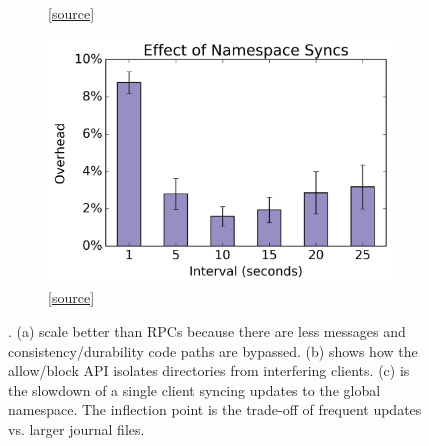 \begin{figure}[tb]
\begin{subfigure}[b]{.3\linewidth}
      \caption{
      [\href{https://github.com/michaelsevilla/cudele-popper/blob/revision/experiments/cudele-blockapi/visualize/viz.ipynb}{source}]
      }\label{fig:block-allow}
  \end{subfigure}
  \begin{subfigure}[b]{.3\linewidth}
      \centering
      \includegraphics[width=1.0\linewidth]{graphs/slowdown-sync.png}
      \caption{
      [\href{https://github.com/michaelsevilla/cudele-popper/blob/revision/experiments/cudele-partialreads/visualize/viz.ipynb}{source}]
      }\label{fig:slowdown-sync}
  \end{subfigure}
\caption{. (a)  scale better than RPCs because there
are less messages and consistency/durability code paths are bypassed. (b) shows
how the allow/block API isolates directories from interfering clients. (c) is
the slowdown of a single client syncing updates to the global namespace. The
inflection point is the trade-off of frequent updates vs. larger journal
files.}
\label{fig:use-cases}
\end{figure}

